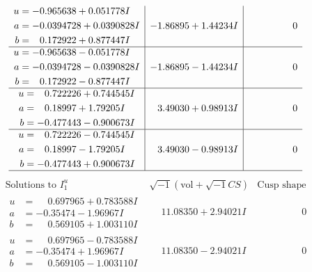 \documentclass[1p]{elsarticle_modified}
\theoremstyle{definition}
\newcommand{\I}{\sqrt{-1}}
\begin{document}
$$\begin{array}{c|c|c}
\begin{aligned}
u &= -0.965638 + 0.051778 I \\
a &= -0.0394728 + 0.0390828 I \\
b &= \phantom{-}0.172922 + 0.877447 I\end{aligned}
 & -1.86895 + 1.44234 I & \phantom{-0.000000 } 0 \\ \hline\begin{aligned}
u &= -0.965638 - 0.051778 I \\
a &= -0.0394728 - 0.0390828 I \\
b &= \phantom{-}0.172922 - 0.877447 I\end{aligned}
 & -1.86895 - 1.44234 I & \phantom{-0.000000 } 0 \\ \hline\begin{aligned}
u &= \phantom{-}0.722226 + 0.744545 I \\
a &= \phantom{-}0.18997 + 1.79205 I \\
b &= -0.477443 - 0.900673 I\end{aligned}
 & \phantom{-}3.49030 + 0.98913 I & \phantom{-0.000000 } 0 \\ \hline\begin{aligned}
u &= \phantom{-}0.722226 - 0.744545 I \\
a &= \phantom{-}0.18997 - 1.79205 I \\
b &= -0.477443 + 0.900673 I\end{aligned}
 & \phantom{-}3.49030 - 0.98913 I & \phantom{-0.000000 } 0\\
 \hline 
 \end{array}$$\newpage$$\begin{array}{c|c|c}  
\text{Solutions to }I^u_{1}& \I (\text{vol} + \sqrt{-1}CS) & \text{Cusp shape}\\
 \hline 
\begin{aligned}
u &= \phantom{-}0.697965 + 0.783588 I \\
a &= -0.35474 - 1.96967 I \\
b &= \phantom{-}0.569105 + 1.003110 I\end{aligned}
 & \phantom{-}11.08350 + 2.94021 I & \phantom{-0.000000 } 0 \\ \hline\begin{aligned}
u &= \phantom{-}0.697965 - 0.783588 I \\
a &= -0.35474 + 1.96967 I \\
b &= \phantom{-}0.569105 - 1.003110 I\end{aligned}
 & \phantom{-}11.08350 - 2.94021 I & \phantom{-0.000000 } 0 \\ \hline\begin{aligned}

\end{aligned}
\end{array}$$
\end{document}
